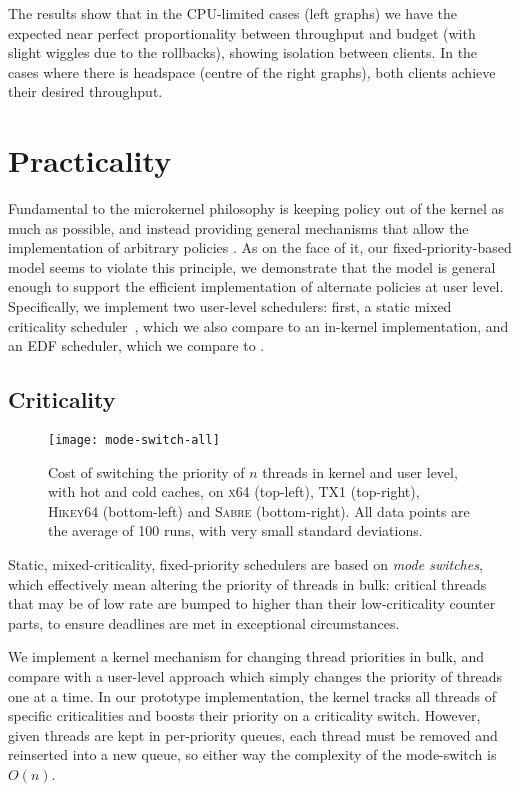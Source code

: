 The results show that in the CPU-limited cases (left graphs)
we have the expected near perfect proportionality between throughput and
budget (with slight wiggles due to the rollbacks), showing isolation between clients. In the cases where there is headspace (centre of the right
graphs), both clients achieve their desired throughput.

\section{Practicality}

Fundamental to the microkernel philosophy is keeping policy out of the
kernel as much as possible, and instead providing general mechanisms
that allow the implementation of arbitrary policies
\citep{Heiser_Elphinstone_16}.  As on the face of it, our
fixed-priority-based model seems to violate this principle,  we
demonstrate that the model is general enough to support the efficient
implementation of alternate policies at user level. Specifically, we
implement two user-level schedulers: first, a static mixed criticality
scheduler~\citep{Baruah_BD_11}, which we also compare to an in-kernel
implementation, and an \gls{EDF} scheduler, which we compare to \litmus.

\subsection{Criticality}

\begin{figure}[t]
  \centering
  \texttt{[image: mode-switch-all]}
  \caption[Kernel vs. user-level criticality switch.]{Cost of switching the priority of $n$ threads in kernel and user level, with hot
      and cold caches, on \textsc{x64} (top-left), \textsc{TX1} (top-right), \textsc{Hikey64}
      (bottom-left) and \textsc{Sabre} (bottom-right). All data points are the average of 100 runs,
                  with very small standard deviations.}
  \label{f:mode-switch}
\end{figure}


Static, mixed-criticality, fixed-priority schedulers are based on \emph{mode
switches}, which effectively mean altering the priority of threads in bulk:
critical threads that may be of low rate are bumped to higher than their
low-criticality counter parts, to ensure deadlines are met in exceptional
circumstances. 

We implement a kernel mechanism for changing thread priorities in bulk,
and compare with a user-level approach which simply changes the priority of threads
one at a time. In our prototype implementation, the kernel tracks all threads of specific
criticalities and boosts their priority on a criticality switch. However, given threads are kept in per-priority queues, each thread must be removed and reinserted into a new queue, so either way the complexity of the mode-switch is $O(n)$. 

